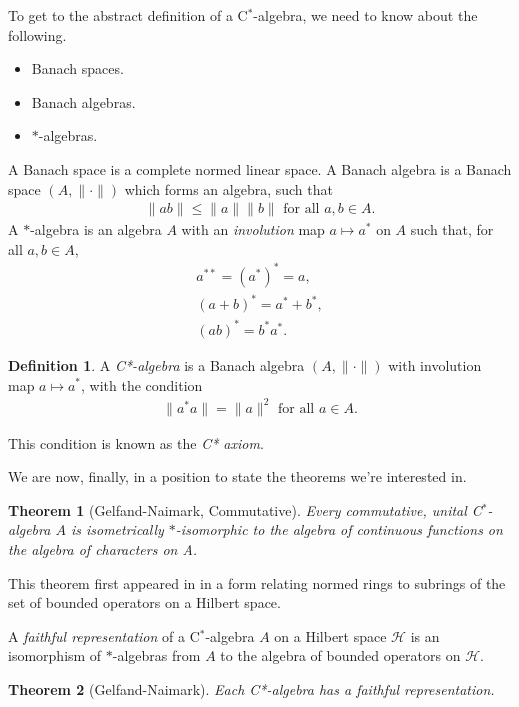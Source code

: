 \documentclass[12pt,a4paper]{amsart}
\theoremstyle{plain}
\newtheorem*{thm*}{Theorem}
\theoremstyle{definition}
\newtheorem*{defn*}{Definition}
\begin{document}
	To get to the abstract definition of a C$^\ast$-algebra, we need to know about the following.
\begin{itemize}
	\item Banach spaces.
	\item Banach algebras.
	\item $\ast$-algebras.
\end{itemize}

	A Banach space is a complete normed linear space. 
	A Banach algebra is a Banach space $(A,\| \cdot \|)$ which forms an algebra, such that 
\begin{align*}
	\|ab\| \leq \|a\| \|b\| \mbox{ for all } a,b \in A.
\end{align*}
	A $\ast$-algebra is an algebra $A$ with an \emph{involution} map $a \mapsto a^\ast$ on $A$ such that, for all $a,b \in A$,
\begin{align*}
	 a^{\ast\ast} = (a^\ast)^\ast = a,\\
	(a+b)^\ast = a^\ast + b^\ast,\\	
	(ab)^\ast = b^\ast a^\ast.
\end{align*}

\begin{defn*}
	A \emph{C*-algebra} is a Banach algebra $(A, \| \cdot \|)$ with involution map $a \mapsto a^\ast$, with the condition
\begin{align*}
	\|a ^\ast a\| = \|a\|^2 \mbox{ for all } a \in A.
\end{align*}
\end{defn*}
\noindent This condition is known as the \emph{C* axiom}. 

	We are now, finally, in a position to state the theorems we're interested in.

\begin{thm*}[Gelfand-Naimark, Commutative]
	Every commutative, unital C$^\ast$-algebra $A$ is isometrically $\ast$-isomorphic to the algebra of continuous functions on the algebra of characters on A.
\end{thm*}

	This theorem first appeared in \cite{gelfand43} in a form relating normed rings to subrings of the set of bounded operators on a Hilbert space.

	A \emph{faithful representation} of a C$^\ast$-algebra $A$ on a Hilbert space $\mathcal{H}$ is an isomorphism of $\ast$-algebras from $A$ to the algebra of bounded operators on $\mathcal{H}$.

\begin{thm*}[Gelfand-Naimark]
	Each C*-algebra has a faithful representation.
\end{thm*}
\end{document}
